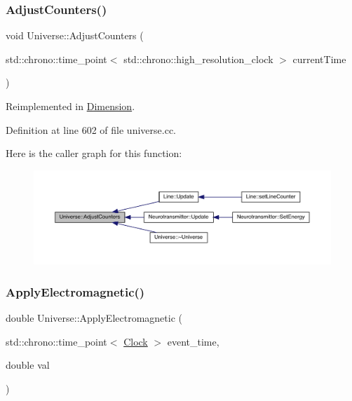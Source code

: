 \subsubsection{\texorpdfstring{Adjust\+Counters()}{AdjustCounters()}}
{\footnotesize\ttfamily void Universe\+::\+Adjust\+Counters (\begin{DoxyParamCaption}\item[{std\+::chrono\+::time\+\_\+point$<$ std\+::chrono\+::high\+\_\+resolution\+\_\+clock $>$}]{current\+Time }\end{DoxyParamCaption})\hspace{0.3cm}{\ttfamily [virtual]}}



Reimplemented in \hyperlink{class_dimension_a31e28c2777888449fad32843f6dd15ed}{Dimension}.



Definition at line 602 of file universe.\+cc.

Here is the caller graph for this function\+:
\nopagebreak
\begin{figure}[H]
\begin{center}
\leavevmode
\includegraphics[width=350pt]{class_universe_a15aa20218286fd11ecb9b792dfb63be3_icgraph}
\end{center}
\end{figure}
\mbox{\label{class_universe_a1f787da78fa196ba635db21a9e91dabb}} 
\subsubsection{\texorpdfstring{Apply\+Electromagnetic()}{ApplyElectromagnetic()}}
{\footnotesize\ttfamily double Universe\+::\+Apply\+Electromagnetic (\begin{DoxyParamCaption}\item[{std\+::chrono\+::time\+\_\+point$<$ \hyperlink{universe_8h_a0ef8d951d1ca5ab3cfaf7ab4c7a6fd80}{Clock} $>$}]{event\+\_\+time,  }\item[{double}]{val }\end{DoxyParamCaption})\hspace{0.3cm}{\ttfamily [virtual]}}




